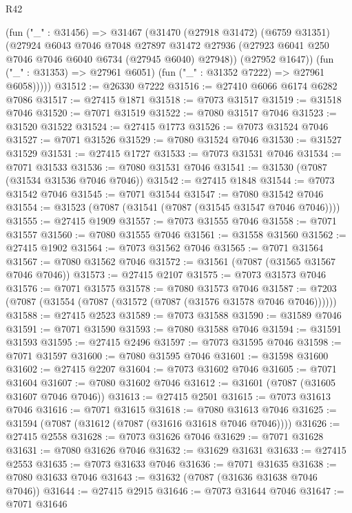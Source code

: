 \begin{lexlean}{R42}
\begin{coremodule}
{          (fun ("_" : @31456) =>
          @31467
            (@31470
              (@27918 @31472)
              (@6759 @31351)
              (@27924
                @6043
                @7046
                @7048
                @27897
                @31472
                @27936
                (@27923 @6041 @250 @7046 @7046 @6040 @6734 (@27945 @6040) @27948))
              (@27952 @1647))
            (fun ("_" : @31353) => @27961 @6051)
            (fun ("_" : @31352 @7222) => @27961 @6058)))))
@31512 := @26330 @7222
@31516 := @27410 @6066 @6174 @6282 @7086
@31517 := @27415 @1871
@31518 := @7073 @31517
@31519 := @31518 @7046
@31520 := @7071 @31519
@31522 := @7080 @31517 @7046
@31523 := @31520 @31522
@31524 := @27415 @1773
@31526 := @7073 @31524 @7046
@31527 := @7071 @31526
@31529 := @7080 @31524 @7046
@31530 := @31527 @31529
@31531 := @27415 @1727
@31533 := @7073 @31531 @7046
@31534 := @7071 @31533
@31536 := @7080 @31531 @7046
@31541 := @31530 (@7087 (@31534 @31536 @7046 @7046))
@31542 := @27415 @1848
@31544 := @7073 @31542 @7046
@31545 := @7071 @31544
@31547 := @7080 @31542 @7046
@31554 := @31523 (@7087 (@31541 (@7087 (@31545 @31547 @7046 @7046))))
@31555 := @27415 @1909
@31557 := @7073 @31555 @7046
@31558 := @7071 @31557
@31560 := @7080 @31555 @7046
@31561 := @31558 @31560
@31562 := @27415 @1902
@31564 := @7073 @31562 @7046
@31565 := @7071 @31564
@31567 := @7080 @31562 @7046
@31572 := @31561 (@7087 (@31565 @31567 @7046 @7046))
@31573 := @27415 @2107
@31575 := @7073 @31573 @7046
@31576 := @7071 @31575
@31578 := @7080 @31573 @7046
@31587 := @7203 (@7087 (@31554 (@7087 (@31572 (@7087 (@31576 @31578 @7046 @7046))))))
@31588 := @27415 @2523
@31589 := @7073 @31588
@31590 := @31589 @7046
@31591 := @7071 @31590
@31593 := @7080 @31588 @7046
@31594 := @31591 @31593
@31595 := @27415 @2496
@31597 := @7073 @31595 @7046
@31598 := @7071 @31597
@31600 := @7080 @31595 @7046
@31601 := @31598 @31600
@31602 := @27415 @2207
@31604 := @7073 @31602 @7046
@31605 := @7071 @31604
@31607 := @7080 @31602 @7046
@31612 := @31601 (@7087 (@31605 @31607 @7046 @7046))
@31613 := @27415 @2501
@31615 := @7073 @31613 @7046
@31616 := @7071 @31615
@31618 := @7080 @31613 @7046
@31625 := @31594 (@7087 (@31612 (@7087 (@31616 @31618 @7046 @7046))))
@31626 := @27415 @2558
@31628 := @7073 @31626 @7046
@31629 := @7071 @31628
@31631 := @7080 @31626 @7046
@31632 := @31629 @31631
@31633 := @27415 @2553
@31635 := @7073 @31633 @7046
@31636 := @7071 @31635
@31638 := @7080 @31633 @7046
@31643 := @31632 (@7087 (@31636 @31638 @7046 @7046))
@31644 := @27415 @2915
@31646 := @7073 @31644 @7046
@31647 := @7071 @31646
}
\end{coremodule}
\end{lexlean}
